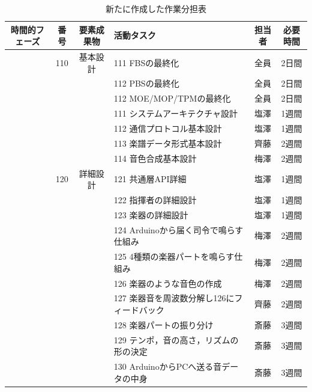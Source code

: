 \documentclass[lualatex,book,paper=a4paper,jafontsize=11.5pt,jafontscale=1.05]{jlreq}
\begin{document}
\begin{table}[H]
\centering
\footnotesize %
\caption{新たに作成した作業分担表}
\renewcommand{\arraystretch}{0.9}
\label{yakuwari}
\begin{tabular}{|c|c|c|p{5cm}|c|c|}
\hline
時間的フェーズ & 番号 & 要素成果物 & 活動タスク & 担当者 & 必要時間 \\ \hline

& 110 & 基本設計 & 111 FBSの最終化 & 全員 & 2日間 \\ 
& & & 112 PBSの最終化 & 全員 & 2日間 \\ 
& & & 112 MOE/MOP/TPMの最終化 & 全員 & 2日間 \\ 
& & & 111 システムアーキテクチャ設計 & 塩澤 & 1週間 \\ 
& & & 112 通信プロトコル基本設計 & 塩澤 & 1週間 \\ 
& & & 113 楽譜データ形式基本設計 & 齊藤 & 2週間 \\ 
& & & 114 音色合成基本設計 & 梅澤 & 2週間 \\ 
& 120 & 詳細設計 & 121 共通層API詳細 & 塩澤 & 1週間 \\ 
& & & 122 指揮者の詳細設計 & 塩澤 & 1週間 \\ 
& & & 123 楽器の詳細設計 & 塩澤 & 1週間\\ 
& & & 124 Arduinoから届く司令で鳴らす仕組み & 梅澤 & 2週間 \\ 
& & & 125 4種類の楽器パートを鳴らす仕組み & 梅澤 & 2週間 \\ 
& & & 126 楽器のような音色の作成 & 梅澤 & 2週間 \\ 
& & & 127 楽器音を周波数分解し126にフィードバック & 齊藤 & 2週間 \\ 
& & & 128 楽器パートの振り分け & 斎藤 & 3週間 \\ 
& & & 129 テンポ，音の高さ，リズムの形の決定 & 斎藤 & 3週間 \\ 
& & & 130 ArduinoからPCへ送る音データの中身 & 斎藤 & 3週間 \\ \hline


\end{tabular}
\end{table}
\end{document}
